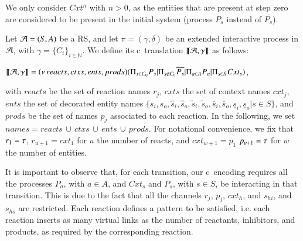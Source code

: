 We only consider $Cxt^n$ with $n >0$, as the entities  that are present at step zero  are considered to be present in the initial system (process $P_s$ instead of $\overline{P_s}$).






\begin{definition}[Translation]
\label{def:trans}
Let ${\cal A} = (S, A)$ be a RS, and let $\pi=(\gamma,\delta)$ be an extended interactive process in ${\cal A}$, with  $\gamma=\{C_i\}_{i\in\mathbb{N}}$. 
We define its c\CNA~translation $\llbracket{\cal A},\gamma \rrbracket$ as follows: 
\begin{center}$\llbracket{\cal A},\gamma \rrbracket = (\nu\, reacts,ctxs,ents,prods)(\Pi_{s\in C_0}P_{s} | \Pi_{s \notin C_0}\overline{P_s} | \Pi_{a\in A} P_a| \Pi_{s\in S} Cxt_s)$,
\end{center} 
with  $reacts$ be the set of reaction names $r_j $, $cxts$ the set of context names $cxt_j$,  $ents$ the set of decorated entity names  $\{s_i,s_o,\hat{s}_i,\hat{s}_o,\tilde{s}_i,\tilde{s}_o,\overline{s}_i,\overline{s}_o,\underline{s}_i,\underline{s}_o| s \in S\}$, and  $prods$ be the set of names $p_j$ associated to each reaction. 
In the following, we set $names = reacts\, \cup\, ctxs\, \cup\, ents\, \cup \, prods$.
For notational convenience, we fix that $r_1 = \tau$,  $r_{u+1} = cxt_1$ for $u$ the number of reacts, and $cxt_{w+1} = p_1$ $p_{u+1}=\tau$ for $w$ the number of entities.
\end{definition}
 



It is important to observe that,   for each transition, our c\CNA \ encoding requires  all the processes $P_a$, with $a \in A$, and  $Cxt_s$ and  $P_s$, with $s \in S$,  be interacting in that transition.
This is due to the fact that  all the channels $r_j$, $p_j$, $cxt_h$, and $s_{hi}$, and $s_{ho}$ are  restricted.
Each reaction defines a pattern to be satisfied, i.e. each reaction inserts as many virtual links  as  the number of reactants, inhibitors, and products, as required by the corresponding reaction.

